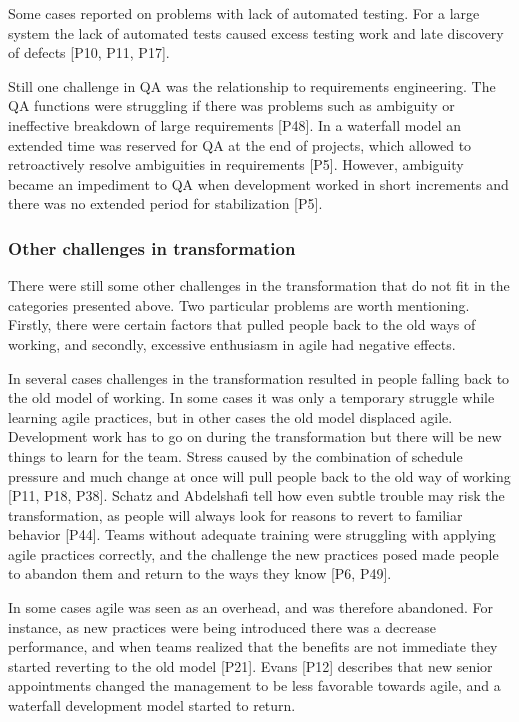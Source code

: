 \documentclass[preprint,authoryear,12pt]{elsarticle}
\begin{document}
Some cases reported on problems with lack of automated testing. For a large
system the lack of automated tests caused excess testing work and late discovery
of defects [P10, P11, P17].

Still one challenge in QA was the relationship to requirements engineering. The
QA functions were struggling if there was problems such as ambiguity or
ineffective breakdown of large requirements [P48]. In a waterfall model an
extended time was reserved for QA at the end of projects, which allowed to
retroactively resolve ambiguities in requirements [P5]. However, ambiguity
became an impediment to QA when development worked in short increments and
there was no extended period for stabilization [P5].


\subsubsection{Other challenges in transformation}

There were still some other challenges in the transformation that do not fit in
the categories presented above. Two particular problems are worth mentioning.
Firstly, there were certain factors that pulled people back to the old ways of
working, and secondly, excessive enthusiasm in agile had negative effects.


In several cases challenges in the transformation resulted in people falling
back to the old model of working. In some cases it was only a temporary struggle
while learning agile practices, but in other cases the old model displaced
agile.
Development work has to go on during the transformation but there will be new
things to learn for the team. Stress caused by the combination of schedule
pressure and much change at once will pull people back to the old way of working
[P11, P18, P38].
Schatz and Abdelshafi tell how even subtle trouble may risk the transformation,
as people will always look for reasons to revert to familiar behavior [P44].
Teams without adequate training were struggling with applying agile practices
correctly, and the challenge the new practices posed made people to abandon them
and return to the ways they know [P6, P49].

In some cases agile was seen as an overhead, and was therefore abandoned. For
instance, as new practices were being introduced there was a decrease
performance, and when teams realized that the benefits are not immediate they
started reverting to the old model [P21].
Evans [P12] describes that new senior appointments changed the management to be
less favorable towards agile, and a waterfall development model started to
return.
\end{document}
